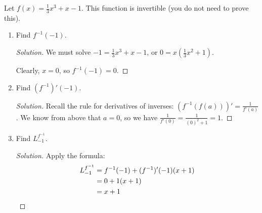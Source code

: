\question Let $f(x)=\frac13x^3+x-1$. This function is invertible (you do not need to prove this).
\begin{enumerate}
  \item Find $f^{-1}(-1)$.
        \begin{proof}[Solution]
          We must solve $-1=\frac13x^3+x-1$, or $0=x(\frac13x^2+1)$.

          Clearly, $x=0$, so $f^{-1}(-1)=0$.
        \end{proof}
  \item Find $(f^{-1})'(-1)$.
        \begin{proof}[Solution]
          Recall the rule for derivatives of inverses: $(f^{-1}(f(a)))' = \frac{1}{f'(a)}$.
          We know from above that $a=0$, so we have $\frac{1}{f'(0)}=\frac{1}{(0)^2+1}=1$.
        \end{proof}
  \item Find $L^{f^{-1}}_{-1}$.
        \begin{proof}[Solution]
          Apply the formula:
          \begin{align*}
            L^{f^{-1}}_{-1} & = f^{-1}(-1)+(f^{-1})'(-1)(x+1) \\
                            & = 0 + 1(x+1)                    \\
                            & = x+1 \qedhere
          \end{align*}
        \end{proof}
\end{enumerate}

